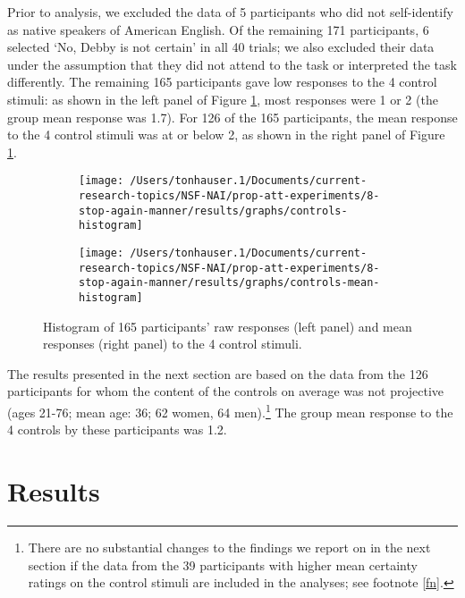 \documentclass[a4paper,12pt]{article}
\newcommand{\6}{\mbox{$[\hspace*{-.6mm}[$}}
\newcommand{\9}{\mbox{$]\hspace*{-.6mm}]$}}
\begin{document}
Prior to analysis, we excluded the data of 5 participants who did not self-identify as native speakers of American English. Of the remaining 171 participants, 6 selected `No, Debby is not certain' in all 40 trials; we also excluded their data under the assumption that they did not attend to the task or interpreted the task differently. The remaining 165 participants gave low responses to the 4 control stimuli: as shown in the left panel of Figure \ref{f-control-histogram}, most responses were 1 or 2 (the group mean response was 1.7). For 126 of the 165 participants, the mean response to the 4 control stimuli was at or below 2, as shown in the right panel of Figure \ref{f-control-histogram}.

\begin{figure}[h!]

\begin{subfigure}{.5\textwidth}
\centering
\texttt{[image: /Users/tonhauser.1/Documents/current-research-topics/NSF-NAI/prop-att-experiments/8-stop-again-manner/results/graphs/controls-histogram]}
\end{subfigure}%
\begin{subfigure}{.5\textwidth}
\centering
\texttt{[image: /Users/tonhauser.1/Documents/current-research-topics/NSF-NAI/prop-att-experiments/8-stop-again-manner/results/graphs/controls-mean-histogram]}
\end{subfigure}

\caption{Histogram of 165 participants' raw responses (left panel) and mean responses (right panel) to the 4 control stimuli.}\label{f-control-histogram}
\end{figure}

 The results presented in the next section are based on the data from the 126 participants for whom the content of the controls on average was not projective (ages 21-76; mean age: 36; 62 women, 64 men).\footnote{There are no substantial changes to the findings we report on in the next section if the data from the 39 participants with higher mean certainty ratings on the control stimuli are included in the analyses; see footnote \ref{fn}.} 
 The group mean response to the 4 controls by these participants was 1.2.

\section{Results}\label{s3}
\end{document}
